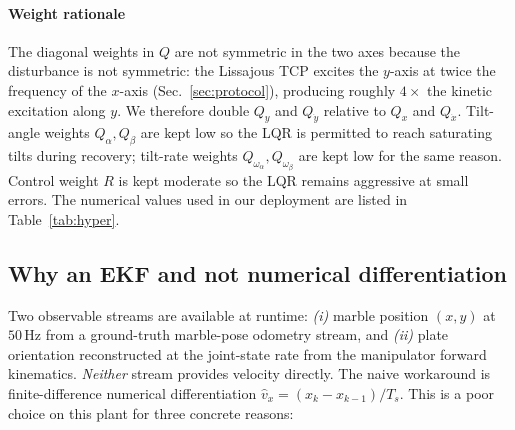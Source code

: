 \documentclass[conference]{IEEEtran}
\begin{document}
\paragraph*{Weight rationale}
The diagonal weights in $Q$ are not symmetric in the two axes because the
disturbance is not symmetric: the Lissajous TCP excites the $y$-axis at
twice the frequency of the $x$-axis (Sec.~\ref{sec:protocol}), producing
roughly $4\times$ the kinetic excitation along $y$. We therefore double
$Q_y$ and $Q_{\dot y}$ relative to $Q_x$ and $Q_{\dot x}$. Tilt-angle
weights $Q_\alpha,Q_\beta$ are kept low so the LQR is permitted to reach
saturating tilts during recovery; tilt-rate weights
$Q_{\omega_\alpha},Q_{\omega_\beta}$ are kept low for the same reason.
Control weight $R$ is kept moderate so the LQR remains aggressive at small
errors. The numerical values used in our deployment are listed in
Table~\ref{tab:hyper}.

\subsection{Why an EKF and not numerical differentiation}
\label{sec:ekf}
Two observable streams are available at runtime: \emph{(i)} marble position
$(x,y)$ at $50\,$Hz from a ground-truth marble-pose odometry stream, and
\emph{(ii)} plate orientation reconstructed at the joint-state rate from
the manipulator forward kinematics. \emph{Neither} stream provides velocity directly. The
naive workaround is finite-difference numerical differentiation
$\hat{v}_x = (x_k - x_{k-1})/T_s$. This is a poor choice on this plant for
three concrete reasons:
\end{document}
